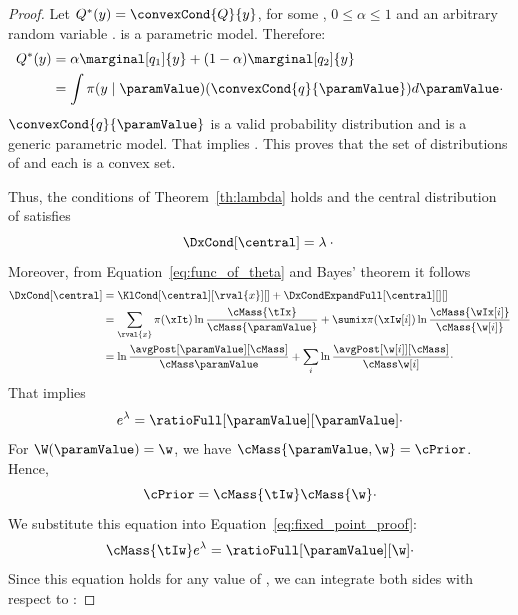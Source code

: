 \begin{proof}
    Let $Q^*(y) = \convexCond{Q}{y}$, for some , $0 \leq \alpha \leq 1$ and
    an arbitrary random variable .
    \Mt is a parametric model.
    Therefore:
    \begin{align*}
        Q^*(y) &= \alpha \marginal[q_1]{y} + (1 - \alpha) \marginal[q_2]{y}\\
        &= \int \pi(y \mid \paramValue) (\convexCond{q}{\paramValue}) d\paramValue\cdot
    \end{align*}
    $\convexCond{q}{\paramValue}$ is a valid probability distribution and \Mt is a generic parametric model.
    That implies .
    This proves that the set of distributions of \X and each \X[i] is a convex set.

    Thus, the conditions of Theorem~\ref{th:lambda} holds and the central distribution of \Qset satisfies
    \begin{equation*}
        \DxCond[\central ] = \lambda \cdot \\
    \end{equation*}
    Moreover, from Equation~\ref{eq:func_of_theta} and Bayes' theorem it follows
    \begin{align*}
        \DxCond[\central] &= \KlCond[\central][\rval{x}][ ] + \DxCondExpandFull[\central][][ ] \\
        &= \sum_{\rval{x}} \pi(\xIt) \ln \frac{\cMass{\tIx}}{\cMass{\paramValue}} +
        \sumix \pi(\xIw[i]) \ln \frac{\cMass{\wIx[i]}}{\cMass{\w[i]}}\\
        &= \ln \ratio{\paramValue} + \sum_i \ln \ratio{\w[i]}\cdot
    \end{align*}
    That implies
    \begin{equation}
        \label{eq:fixed_point_proof}
        e^{\lambda} = \ratioFull[\paramValue][\paramValue] \cdot
    \end{equation}
    For $\W(\paramValue) = \w$, we have $\cMass{\paramValue, \w}=\cPrior$.
    Hence,
    \begin{equation*}
        \cPrior = \cMass{\tIw} \cMass{\w} \cdot
    \end{equation*}
    We substitute this equation into Equation~\ref{eq:fixed_point_proof}:
    \begin{equation}
        \cMass{\tIw} e^{\lambda} = \ratioFull[\paramValue][\w] \cdot
        \label{eq:fixed_point_proof_1}
    \end{equation}
    Since this equation holds for any value of \paramValue, we can integrate both sides with respect to \paramValue:

\end{proof}
